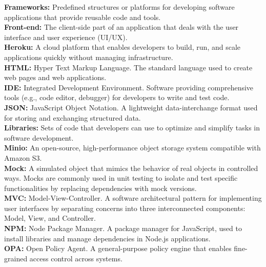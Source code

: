 \textbf{Frameworks:} Predefined structures or platforms for developing software applications that provide reusable code and tools.\\

\textbf{Front-end:} The client-side part of an application that deals with the user interface and user experience (UI/UX).\\

\textbf{Heroku:} A cloud platform that enables developers to build, run, and scale applications quickly without managing infrastructure.\\

\textbf{HTML:} Hyper Text Markup Language. The standard language used to create web pages and web applications.\\

\textbf{IDE:} Integrated Development Environment. Software providing comprehensive tools (e.g., code editor, debugger) for developers to write and test code.\\

\textbf{JSON:} JavaScript Object Notation. A lightweight data-interchange format used for storing and exchanging structured data.\\

\textbf{Libraries:} Sets of code that developers can use to optimize and simplify tasks in software development.\\

\textbf{Minio:} An open-source, high-performance object storage system compatible with Amazon S3.\\

\textbf{Mock:} A simulated object that mimics the behavior of real objects in controlled ways. Mocks are commonly used in unit testing to isolate and test specific functionalities by replacing dependencies with mock versions.\\

\textbf{MVC:} Model-View-Controller. A software architectural pattern for implementing user interfaces by separating concerns into three interconnected components: Model, View, and Controller.\\

\textbf{NPM:} Node Package Manager. A package manager for JavaScript, used to install libraries and manage dependencies in Node.js applications.\\

\textbf{OPA:} Open Policy Agent. A general-purpose policy engine that enables fine-grained access control across systems.\\

